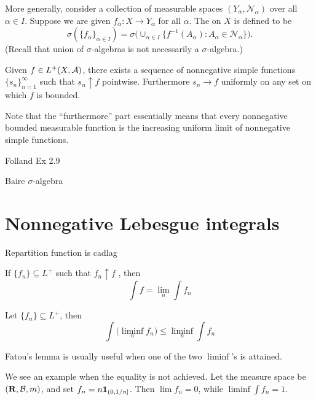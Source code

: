 More generally, consider a collection of measurable spaces $(Y_\alpha,\mathcal{N}_\alpha)$ over all $\alpha \in I$. Suppose we are given $f_\alpha\colon X \to Y_\alpha$ for all $\alpha$. The  on $X$ is defined to be 
\[
    \sigma(\{f_\alpha\}_{\alpha\in I}) = \sigma\bigl(\cup_{\alpha \in I} \{f^{-1}(A_\alpha):A_\alpha\in \mathcal{N}_\alpha\}\bigr).
\] (Recall that union of $\sigma$-algebras is not necessarily a $\sigma$-algebra.)

\begin{namedthm}
    Given $f \in L^+(X,\mathcal{A})$, there exists a sequence of nonnegative simple functions $\{s_n\}_{n=1}^\infty$ such that $s_n \uparrow f$ pointwise. Furthermore $s_n \to f$ uniformly on any set on which $f$ is bounded.
\end{namedthm}

Note that the ``furthermore'' part essentially means that every nonnegative bounded measurable function is the increasing uniform limit of nonnegative simple functions.

Folland Ex 2.9

Baire $\sigma$-algebra

\section{Nonnegative Lebesgue integrals}

Repartition function is cadlag


\begin{namedthm} \label{thm:MCT}
    If $\{f_n\} \subseteq L^+$ such that $f_n \uparrow f$ , then \[
        \int f = \lim_n \int f_n
    \]
\end{namedthm}
\begin{namedthm} \label{thm:Fatou}
    Let $\{f_n\}\subseteq L^+$, then \[
        \int \bigl(\liminf_n f_n\bigr) \leq \liminf_n \int f_n
    \]
\end{namedthm}

Fatou's lemma is usually useful when one of the two $\liminf$'s is attained.

We see an example when the equality is not achieved. Let the measure space be $(\mathbf{R},\mathcal{B},m)$, and set $f_n = n \mathbf{1}_{(0,1/n]}$. Then $\lim f_n = 0$, while $\liminf \int f_n = 1$.


